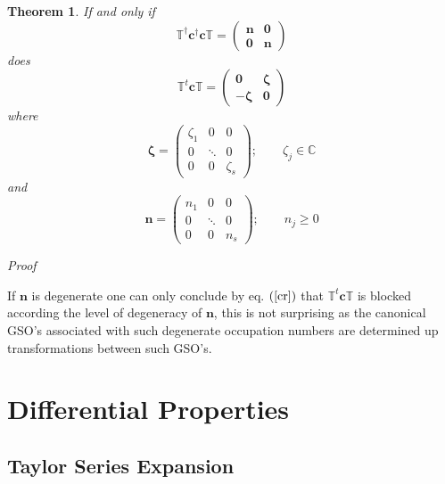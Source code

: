 \documentclass{article}
\newtheorem{theorem}{Theorem}
\begin{document}
\begin{theorem}
If and only if 
\begin{equation}
\mathbb{T}^{\dagger }\mathbf{c}^{\dagger }\mathbf{c}\mathbb{T=}\left( 
\begin{array}{cc}
\mathbf{n} & \mathbf{0} \\ 
\mathbf{0} & \mathbf{n}%
\end{array}%
\right)  \label{th1}
\end{equation}%
does 
\begin{equation}
\mathbb{T}^{t}\mathbf{c}\mathbb{T=}\left( 
\begin{array}{cc}
\mathbf{0} & \mathbf{\zeta } \\ 
-\mathbf{\zeta } & \mathbf{0}%
\end{array}%
\right)  \label{th3}
\end{equation}%
where 
\begin{equation}
\mathbf{\zeta =}\left( 
\begin{array}{ccc}
\zeta _{1} & 0 & 0 \\ 
0 & \ddots & 0 \\ 
0 & 0 & \zeta _{s}%
\end{array}%
\right) ;\qquad \zeta _{j}\in \mathbb{C}
\end{equation}%
and 
\begin{equation}
\mathbf{n=}\left( 
\begin{array}{ccc}
n_{1} & 0 & 0 \\ 
0 & \ddots & 0 \\ 
0 & 0 & n_{s}%
\end{array}%
\right) ;\qquad n_{j}\geq 0
\end{equation}
\end{theorem}

\textit{Proof}

If $\mathbf{n}$ is degenerate one can only conclude by eq. $\left( \ref{cr}%
\right) $ that $\mathbb{T}^{t}\mathbf{c}\mathbb{T}$ is blocked according the
level of degeneracy of $\mathbf{n}$, this is not surprising as the canonical
GSO's associated with such degenerate occupation numbers are determined up
transformations between such GSO's.

\section{Differential Properties}

\subsection{Taylor Series Expansion}
\end{document}
